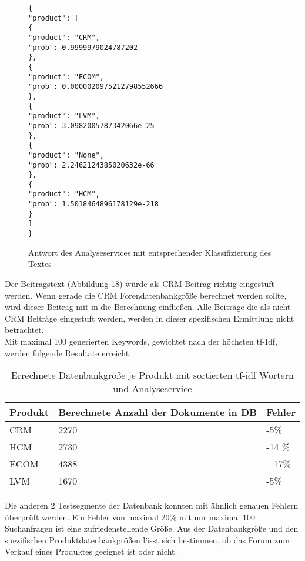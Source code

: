 \newpage

\begin{figure}[h!]
\begin{lstlisting}[language=HTML5]
{
"product": [
{
"product": "CRM",
"prob": 0.9999979024787202
},
{
"product": "ECOM",
"prob": 0.0000020975212798552666
},
{
"product": "LVM",
"prob": 3.0982005787342066e-25
},
{
"product": "None",
"prob": 2.2462124385020632e-66
},
{
"product": "HCM",
"prob": 1.5018464896178129e-218
}
]
}
\end{lstlisting}
\caption{Antwort des Analyseservices mit entsprechender Klassifizierung des Textes}
\end{figure}

Der Beitragstext (Abbildung 18) würde als CRM Beitrag richtig eingestuft werden. Wenn gerade die CRM Forendatenbankgröße berechnet werden sollte, wird dieser Beitrag mit in die Berechnung einfließen. Alle Beiträge die als nicht CRM Beiträge eingestuft werden, werden in dieser spezifischen Ermittlung nicht betrachtet.\\
Mit maximal 100 generierten Keywords, gewichtet nach der höchsten tf-Idf, werden folgende Resultate erreicht:

\begin{table}[h!]
\begin{tabular}{ | p{3cm} | l | l |}
\hline
Produkt & Berechnete Anzahl der Dokumente in DB & Fehler \\ \hline
CRM & 2270 & -5\% \\ \hline
HCM & 2730 & -14 \% \\ \hline
ECOM & 4388 & +17\% \\ \hline
LVM & 1670 & -5\% \\ \hline
\end{tabular}
\caption{Errechnete Datenbankgröße je Produkt mit sortierten tf-idf Wörtern und Analyseservice}
\end{table}

Die anderen 2 Testsegmente der Datenbank konnten mit ähnlich genauen Fehlern überprüft werden.
Ein Fehler von maximal 20\% mit nur maximal 100 Suchanfragen ist eine zufriedenstellende Größe. Aus der Datenbankgröße und den spezifischen Produktdatenbankgrößen lässt sich bestimmen, ob das Forum zum Verkauf eines Produktes geeignet ist oder nicht.
